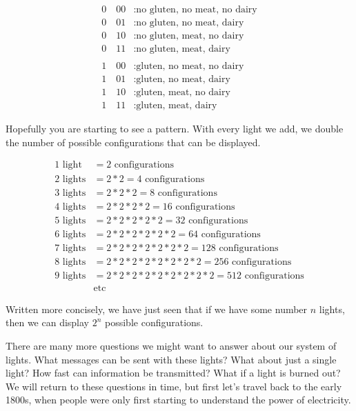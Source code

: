 \documentclass[UTF8]{book}
\begin{document}
\begin{CJK}{UTF8}{gbsn}
\begin{align*}
	0\quad00&: \text{no gluten, no meat, no dairy} \\
	0\quad 01&: \text{no gluten, no meat, dairy} \\
	0\quad 10&: \text{no gluten, meat, no dairy} \\
	0\quad 11&: \text{no gluten, meat, dairy} \\
          \\
	1\quad 00&: \text{gluten, no meat, no dairy} \\
	1\quad 01&: \text{gluten, no meat, dairy} \\
	1\quad 10&: \text{gluten, meat, no dairy} \\
	1\quad 11&: \text{gluten, meat, dairy}
\end{align*}

Hopefully you are starting to see a pattern. With every light we add, we double the number of possible configurations that can be displayed.

\begin{align*}
1 \text{ light} &= 2 \text{ configurations} \\
2 \text{ lights} &= 2*2 = 4 \text{ configurations} \\
3 \text{ lights} &= 2*2*2 = 8 \text{ configurations} \\
4 \text{ lights} &= 2*2*2*2 = 16 \text{ configurations} \\
5 \text{ lights} &= 2*2*2*2*2 = 32 \text{ configurations} \\
6 \text{ lights} &= 2*2*2*2*2*2 = 64 \text{ configurations} \\
7 \text{ lights} &= 2*2*2*2*2*2*2 = 128 \text{ configurations} \\
8 \text{ lights} &= 2*2*2*2*2*2*2*2 = 256 \text{ configurations} \\
9 \text{ lights} &= 2*2*2*2*2*2*2*2*2 = 512 \text{ configurations} \\
&\text{etc}
\end{align*}

Written more concisely, we have just seen that if we have some number $n$ lights, then we can display $2^n$ possible configurations.

There are many more questions we might want to answer about our system of lights. What messages can be sent with these lights? What about just a single light? How fast can information be transmitted? What if a light is burned out? We will return to these questions in time, but first let's travel back to the early 1800s, when people were only first starting to understand the power of electricity.


\end{CJK}
\end{document}
